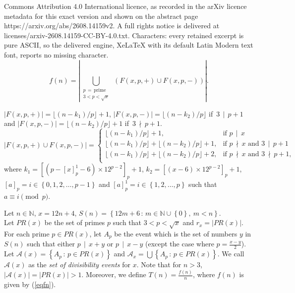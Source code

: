 \documentclass[10pt,a4paper]{amsart}
\newcommand{\Div}[2]{#1\,\mid\, #2}
\newcommand{\Mod}[3]{#1\equiv #2 \pmod{#3}}
\newcommand{\Nat}{\mathbb{N}}
\newcommand{\Set}[2]{\set{#1\, :\, #2}}
\newcommand{\nDiv}[2]{#1\,\nmid\, #2}
\newcommand{\set}[1]{\left\{#1\right\}}
\begin{document}
Commons Attribution 4.0 International licence, as recorded in the arXiv licence metadata for this exact version and shown on the abstract page https://arxiv.org/abs/2608.14159v2. A full rights notice is delivered at licenses/arxiv-2608.14159-CC-BY-4.0.txt. Characters: every retained excerpt is pure ASCII, so the delivered engine, XeLaTeX with its default Latin Modern text font, reports no missing character.
\begin{equation}\label{eqfn}
f(n)=|\bigcup\limits_{\substack{p\, =\, \text{prime}\\ 3<p<\sqrt{x}}} \ \left(F(x,p,+)\cup F(x,p,-)\right)|.
\end{equation}

\begin{lemma}\label{lemfp4}
$|F(x,p,+)|=\lfloor (n-k_1)/p\rfloor+1$, $|F(x,p,-)|=\lfloor (n-k_2)/p\rfloor $ if\ $\Div{3}{p+1}$ and $|F(x,p,-)|=\lfloor (n-k_2)/p\rfloor +1$ if\ $\nDiv{3}{p+1}$.  
$$|F(x,p,+)\cup F(x,p,-)|=\left\{\begin{array}{ll}
\lfloor (n-k_1)/p\rfloor+1, & \text{if } \Div{p}{x}\\
\lfloor (n-k_1)/p\rfloor + \lfloor (n-k_2)/p\rfloor +1, & \text{if } \nDiv{p}{x}\text{ and } \Div{3}{p+1}\\
\lfloor (n-k_1)/p\rfloor + \lfloor (n-k_2)/p\rfloor +2, & \text{if } \nDiv{p}{x}\text{ and } \nDiv{3}{p+1},\\
\end{array}\right.$$
where $k_1=[(p-[x]_p^1-6)\times 12^{p-2}]_p+1$, $k_2=[(x-6)\times 12^{p-2}]_p+1$, $[a]_p=i\in\set{0,1,2,\ldots,p-1}$ and $[a]_p^1=i\in\set{1,2,\ldots,p}$ such that $\Mod{a}{i}{p}$.
\end{lemma}

\begin{definition}\label{defap}
Let $n\in\Nat$, $x=12n+4$, $S(n)=\Set{12m+6}{m\in\Nat\cup\set{0},\ m<n}$.\\
 Let $PR(x)$ be the set of primes $p$ such that $3<p<\sqrt{x}$ and $r_x=|PR(x)|$. For each prime $p\in PR(x)$, let $A_{p}$ be the event which is the set of numbers $y$ in $S(n)$ such that either $\Div{p}{x+y}$ or $\Div{p}{x-y}$ (except the case where $p=\frac{x-y}{2}$). Let $\mathscr{A}(x)=\Set{A_p}{p\in PR(x)}$ and $\mathscr{A}_x=\bigcup \Set{A_p}{p\in PR(x)}$. We call $\mathscr{A}(x)$ as the {\em set of divisibility events} for $x$. Note that for $n>3$, $|\mathscr{A}(x)|=|PR(x)|>1$. Moreover, we define $T(n)=\frac{f(n)}{n}$, where $f(n)$ is given by (\ref{eqfn}).
\end{definition}
\end{document}
